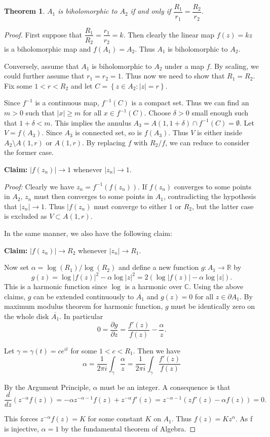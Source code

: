 \documentclass{article} %
\newtheorem{theorem}{Theorem}
\begin{document}
\begin{theorem}
  $A_1$ is biholomorphic to $A_2$ if and only if $\dfrac{R_1}{r_1} = \dfrac{R_2}{r_2}$.
\end{theorem}
\begin{proof}
  First suppose that $\dfrac{R_1}{R_2} = \dfrac{r_1}{r_2} =k$. Then clearly the linear map $f(z)=kz$
  is a biholomorphic map and $f(A_1) = A_2$. Thus $A_1$ is biholomorphic to $A_2$.

  Conversely, assume that $A_1$ is biholomorphic to $A_2$ under a map $f$. By scaling, we could further assume that $r_1=r_2=1$. Thus now we need to show that $R_1=R_2$.
  Fix some $1<r<R_2$ and let $C = \left\lbrace z \in A_2 \colon |z|=r\right\rbrace$.

  Since $f^{-1}$ is a continuous map, $f^{-1}(C)$ is a compact set. Thus we can find
  an $m>0$ such that $|x| \ge m$ for all $x \in f^{-1}(C)$. Choose $\delta>0$ small enough
  such that $1+\delta<m$. This implies the annulus $A_3 = A(1,1+\delta) \cap f^{-1}(C)=\emptyset$. Let
  $V = f(A_3)$. Since $A_3$ is connected set, so is $f(A_3)$. Thus $V$ is either inside
  $A_2\setminus A(1,r)$ or $A(1,r)$. By replacing $f$ with $R_2/f$, we can reduce to consider the former case.

  \textbf{Claim:} $|f(z_n)| \to 1$ whenever $|z_n| \to 1$.

  \textit{Proof:} Clearly we have $z_n = f^{-1}(f(z_n))$. If $f(z_n)$ converges to some points
  in $A_2$, $z_n$ must then converges to some points in $A_1$, contradicting the hypothesis that
  $|z_n| \to 1$. Thus $|f(z_n)$ must converge to either $1$ or $R_2$, but the latter case is excluded as $V \subset A(1,r)$.

  In the same manner, we also have the following claim:

  \textbf{Claim:} $|f(z_n)| \to R_2$ whenever $|z_n| \to R_1$.

  Now set $\alpha = \log(R_1)/\log(R_2)$ and define a new function $g \colon A_1 \to \mathbb{R}$ by
  \[g(z) = \log|f(z)|^2 - \alpha\log|z|^2 = 2(\log|f(z)| - \alpha\log|z|).\]
  This is a harmonic function since $\log$ is a harmonic over $\mathbb{C}$. Using the above claims, $g$ can be
  extended continuously to $\overline{A_1}$ and $g(z)=0$ for all $z \in \partial A_1$. By maximum
  modulus theorem for harmonic function, $g$ must be identically zero on the whole disk $\overline{A_1}$.
  In particular
  \[ 0 = \dfrac{\partial g}{\partial z} = \dfrac{f'(z)}{f(z)}-\dfrac{\alpha}{z}.\]

  Let $\gamma = \gamma(t)= ce^{it}$ for some $1<c<R_1$. Then we have
  \[\alpha = \dfrac{1}{2\pi i}\int_{\gamma}\dfrac{\alpha}{z} =\dfrac{1}{2\pi i}\int_{\gamma}\dfrac{f'(z)}{f(z)} \]

  By the Argument Principle, $\alpha$ must be an integer. A consequence is that
  \[\dfrac{d}{dz}(z^{-\alpha}f(z))= -\alpha z^{-\alpha-1}f(z)+z^{-\alpha}f'(z) = z^{-\alpha-1}(zf'(z)-\alpha f(z))=0.\]

  This forces $z^{-\alpha}f(z)=K$ for some constant $K$ on $A_1$. Thus $f(z)=Kz^{\alpha}$. As f is injective, $\alpha=1$ by the fundamental theorem of Algebra.
\end{proof}
\end{document}
